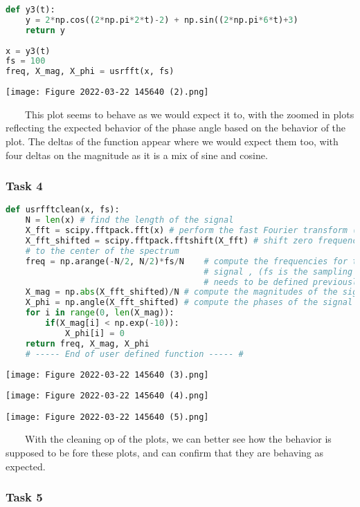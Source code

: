 \documentclass[11pt,a4]{article}
\begin{document}
\begin{lstlisting}[language=Python]
def y3(t):
    y = 2*np.cos((2*np.pi*2*t)-2) + np.sin((2*np.pi*6*t)+3)
    return y
    
x = y3(t)
fs = 100
freq, X_mag, X_phi = usrfft(x, fs)
\end{lstlisting}

\texttt{[image: Figure 2022-03-22 145640 (2).png]}

\ \ \ \ This plot seems to behave as we would expect it to, with the zoomed in plots reflecting the expected behavior of the phase angle based on the behavior of the plot. The deltas of the function appear where we would expect them too, with four deltas on the magnitude as it is a mix of sine and cosine.

\subsubsection{Task 4}

\begin{lstlisting}[language=Python]
def usrfftclean(x, fs):
    N = len(x) # find the length of the signal
    X_fft = scipy.fftpack.fft(x) # perform the fast Fourier transform (fft)
    X_fft_shifted = scipy.fftpack.fftshift(X_fft) # shift zero frequency components
    # to the center of the spectrum
    freq = np.arange(-N/2, N/2)*fs/N    # compute the frequencies for the output
                                        # signal , (fs is the sampling frequency and
                                        # needs to be defined previously in your code
    X_mag = np.abs(X_fft_shifted)/N # compute the magnitudes of the signal
    X_phi = np.angle(X_fft_shifted) # compute the phases of the signal
    for i in range(0, len(X_mag)):
        if(X_mag[i] < np.exp(-10)):
            X_phi[i] = 0
    return freq, X_mag, X_phi
    # ----- End of user defined function ----- #
\end{lstlisting}

\texttt{[image: Figure 2022-03-22 145640 (3).png]}

\texttt{[image: Figure 2022-03-22 145640 (4).png]}

\texttt{[image: Figure 2022-03-22 145640 (5).png]}

\ \ \ \ With the cleaning op of the plots, we can better see how the behavior is supposed to be fore these plots, and can confirm that they are behaving as expected.

\subsubsection{Task 5}
\end{document}
